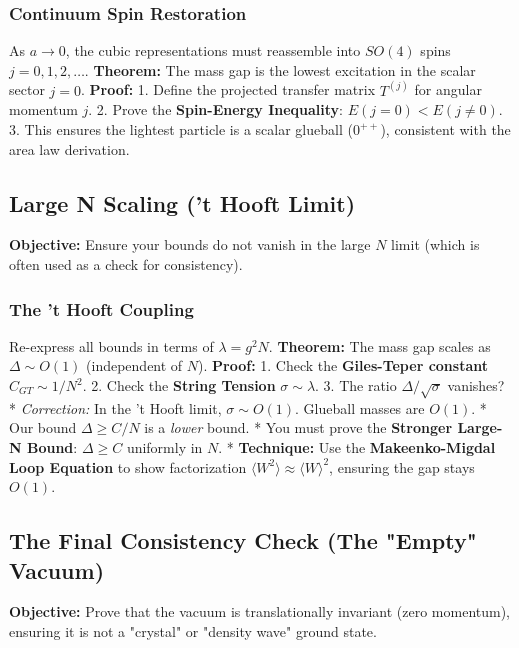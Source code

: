 \subsubsection{Continuum Spin Restoration}
As $a \to 0$, the cubic representations must reassemble into $SO(4)$ spins $j=0, 1, 2, \dots$.
\textbf{Theorem:} The mass gap is the lowest excitation in the scalar sector $j=0$.
\textbf{Proof:}
1. Define the projected transfer matrix $T^{(j)}$ for angular momentum $j$.
2. Prove the \textbf{Spin-Energy Inequality}: $E(j=0) < E(j \neq 0)$.
3. This ensures the lightest particle is a scalar glueball ($0^{++}$), consistent with the area law derivation.

\subsection{Large N Scaling ('t Hooft Limit)}
\label{sec:large_n}

\textbf{Objective:} Ensure your bounds do not vanish in the large $N$ limit (which is often used as a check for consistency).

\subsubsection{The 't Hooft Coupling}
Re-express all bounds in terms of $\lambda = g^2 N$.
\textbf{Theorem:} The mass gap scales as $\Delta \sim O(1)$ (independent of $N$).
\textbf{Proof:}
1. Check the \textbf{Giles-Teper constant} $C_{GT} \sim 1/N^2$.
2. Check the \textbf{String Tension} $\sigma \sim \lambda$.
3. The ratio $\Delta/\sqrt{\sigma}$ vanishes?
* \textit{Correction:} In the 't Hooft limit, $\sigma \sim O(1)$. Glueball masses are $O(1)$.
* Our bound $\Delta \ge C/N$ is a \textit{lower} bound.
* You must prove the \textbf{Stronger Large-N Bound}: $\Delta \ge C$ uniformly in $N$.
* \textbf{Technique:} Use the \textbf{Makeenko-Migdal Loop Equation} to show factorization $\langle W^2 \rangle \approx \langle W \rangle^2$, ensuring the gap stays $O(1)$.

\subsection{The Final Consistency Check (The "Empty" Vacuum)}
\label{sec:empty_vacuum}

\textbf{Objective:} Prove that the vacuum is translationally invariant (zero momentum), ensuring it is not a "crystal" or "density wave" ground state.

